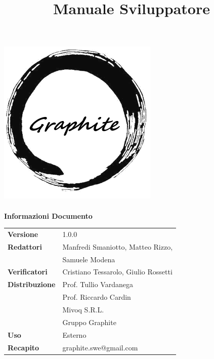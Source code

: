 \documentclass[openany,12pt,a4paper]{report}
\title{Manuale Sviluppatore}
\author{}
\newcommand{\versione}{1.0.0}
\begin{document}
	
	\makeatletter
	\begin{titlepage}
		\setlength{\headsep}{0pt}  
		\begin{center}
			\includegraphics[width=0.5\linewidth]{img/logo.png}\\[1em]
			{\huge \bfseries  \@title }\\[10ex]
			\textbf{\Large Informazioni Documento} \\[2em]
			\bgroup
			\def\arraystretch{1.5}
			\begin{tabular}{l|l}
				\textbf{Versione} & \versione{} \\
				\textbf{Redattori} &  Manfredi Smaniotto, Matteo Rizzo,\\
				& Samuele Modena  \\
				\textbf{Verificatori} & Cristiano Tessarolo, Giulio Rossetti \\
				\textbf{Distribuzione} & Prof. Tullio Vardanega \\
				& Prof. Riccardo Cardin \\
				& Mivoq S.R.L. \\
				& Gruppo Graphite \\
				\textbf{Uso} & Esterno \\
				\textbf{Recapito} & graphite.swe@gmail.com \\
			\end{tabular}
			\egroup
		\end{center}
	\end{titlepage}
	\makeatother
	
	\thispagestyle{empty}
	\newpage
	
	
\end{document}
